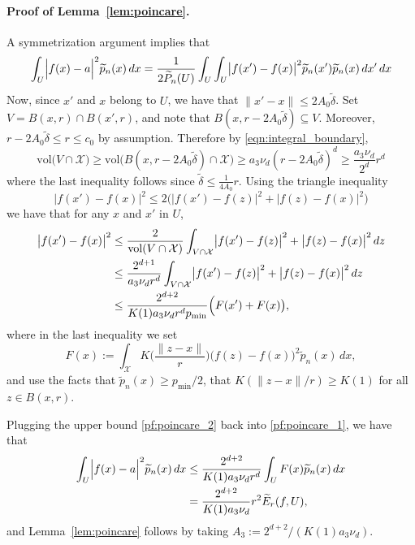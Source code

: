 \documentclass[twoside]{article}
\newcommand{\vol}{\text{vol}}
\newcommand{\1}{\mathbf{1}}
\newcommand{\Xset}{\mathcal{X}}
\newcommand{\mc}[1]{\mathcal{#1}}
\newcommand{\wt}[1]{\widetilde{#1}}
\theoremstyle{definition}
\theoremstyle{remark}
\begin{document}
\paragraph{Proof of Lemma~\ref{lem:poincare}.}
A symmetrization argument implies that
\begin{equation}
\label{pf:poincare_1}
\int_{U} \Bigl|f(x)-a\Bigr|^2 \wt{p}_n(x)\,dx = \frac{1}{2\wt{P}_n(U)} \int_{U} \int_{U} \bigl|f(x') - f(x)\bigr|^2 \wt{p}_n(x') \wt{p}_n(x) \,dx' \,dx
\end{equation}
Now, since $x'$ and $x$ belong to $U$, we have that $\|x' - x\| \leq 2A_0\wt{\delta}$. Set $V = B(x,r) \cap B(x',r)$, and note that $B(x,r - 2A_0\wt{\delta}) \subseteq V$. Moreover, $r - 2A_0\wt{\delta} \leq r \leq c_0$ by assumption. Therefore by \eqref{eqn:integral_boundary},
\begin{equation*}
\vol\bigl(V \cap \Xset\bigr) \geq \vol\bigl(B(x,r - 2A_0\wt{\delta}) \cap \mc{X}\bigr) \geq a_3 \nu_d (r - 2A_0\wt{\delta})^d \geq \frac{a_3 \nu_d}{2^d}r^d 
\end{equation*}
where the last inequality follows since $\wt{\delta} \leq \frac{1}{4A_0}r$. Using the triangle inequality 
\begin{equation*}
\bigl|f(x') - f(x)\big|^2 \leq 2\bigl(\bigl|f(x') - f(z)\big|^2 + \bigl|f(z) - f(x)\big|^2\bigr)
\end{equation*}
we have that for any $x$ and $x'$ in $U$,
\begin{align}
\bigl|f(x') - f(x)\big|^2 & \leq \frac{2}{\vol(V \cap \Xset)} \int_{V \cap \Xset} \bigl|f(x') - f(z)\big|^2 + \bigl|f(z) - f(x)\big|^2 \,dz \nonumber \\
& \leq \frac{2^{d + 1}}{a_3 \nu_d r^d} \int_{V \cap \Xset} \bigl|f(x') - f(z)\big|^2 + \bigl|f(z) - f(x)\big|^2 \,dz \nonumber \\
& \leq \frac{2^{d + 2}}{K(1) a_3 \nu_d r^d p_{\min}} \Bigl(F(x') + F(x)\bigr), \label{pf:poincare_2}
\end{align}
where in the last inequality we set
\begin{equation*}
F(x) := \int_{\Xset} K\biggl(\frac{\|z - x\|}{r}\biggr) \bigl(f(z) - f(x)\bigr)^2 \wt{p}_n(x) \,dx,
\end{equation*}
and use the facts that $\wt{p}_n(x) \geq p_{\min}/2$, that $K(\|z  - x\|/r) \geq K(1)$ for all $z \in B(x,r)$. 

Plugging the upper bound \eqref{pf:poincare_2} back into \eqref{pf:poincare_1}, we have that
\begin{align*}
\int_{U} \Bigl|f(x)-a\Bigr|^2 \wt{p}_n(x)\,dx & \leq \frac{2^{d + 2}}{K(1) a_3 \nu_d r^d} \int_{U} F(x)\wt{p}_n(x) \,dx \\
& = \frac{2^{d + 2}}{K(1) a_3 \nu_d}r^2 \wt{E}_r(f,U),
\end{align*}
and Lemma~\ref{lem:poincare} follows by taking $A_3 := 2^{d + 2}/(K(1) a_3 \nu_d)$.
\end{document}
